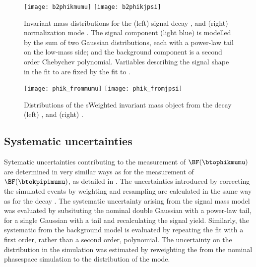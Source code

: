 \begin{figure}
  \begin{center}
    \texttt{[image: b2phikmumu]}
    \texttt{[image: b2phikjpsi]}
    \caption[Fits to \btokphimumu and \btojpsiphik]
    {\small
      Invariant mass distributions for the
      (left) signal decay \btophikmumu, and
      (right) normalization mode \btojpsiphik.
      The signal component (light blue) is modelled by the sum of two Gaussian distributions, each
      with a power-law tail on the low-mass side; and the background component is a second order
      Chebychev polynomial.
      Variiables describing the signal shape in the fit to \btophikmumu are fixed by the fit to
      \btojpsiphik.
    }
    \label{fig:phik:fit}
  \end{center}
\end{figure}


\begin{figure}
  \begin{center}
    \texttt{[image: phik\_frommumu]}
    \texttt{[image: phik\_fromjpsi]}
    \caption[Invariant mass distributions of \phik]
    {\small
      Distributions of the sWeighted invariant mass \phik object from the decay
      (left) \btophikmumu, and
      (right) \btojpsiphik.
    }
    \label{fig:phik:phik}
  \end{center}
\end{figure}






\subsection{Systematic uncertainties}
\label{ssec:phik:syst}

Sytematic uncertainties contributing to the measurement of $\BF(\btophikmumu)$ are determined in
very similar ways as for the measurement of $\BF(\btokpipimumu)$, as detailed in
.
The uncertainties introduced by correcting the simulated events by weighting and resampling are
calculated in the same way as for the decay \btokpipimumu.
The systematic uncertainty arising from the signal mass model was evaluated by
subsituting the nominal double Gaussian with a power-law tail, for a single Gaussian with a tail
and recalculating the signal yield.
Similarly, the systematic from the background model is evaluated by repeating the fit with a first
order, rather than a second order, polynomial.
The uncertainty on the \qsq distribution in the simulation was estimated by reweighting the from
the nominal phasespace simulation to the distribution of the  mode.

